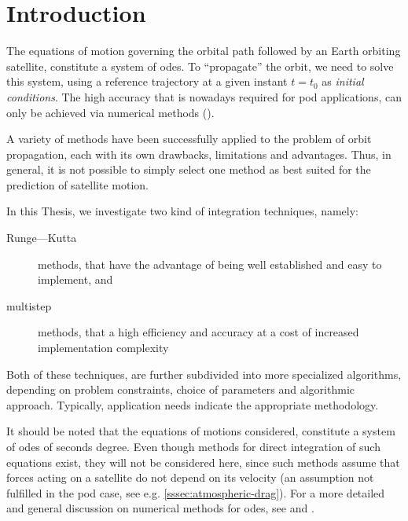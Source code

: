 \section{Introduction}\label{sec:integration-introduction}

The equations of motion governing the orbital path followed by an Earth orbiting 
satellite, constitute a system of \glspl{ode}. To ``propagate'' the orbit, we need 
to solve this system, using a reference trajectory at a given instant $t=t_0$ as 
\emph{initial conditions}. The high accuracy that is nowadays required for \gls{pod} 
applications, can only be achieved via numerical methods (\cite{Montenbruck2000}).

A variety of methods have been successfully applied to the problem of orbit 
propagation, each with its own drawbacks, limitations and advantages. Thus, in 
general, it is not possible to simply select one method as best suited for the 
prediction of satellite motion.

In this Thesis, we investigate two kind of integration techniques, namely:
\begin{description}
    \item[Runge—Kutta] methods, that have the advantage of being well established 
      and easy to implement, and
    \item[multistep] methods, that a high efficiency and accuracy at a cost of 
      increased implementation complexity
\end{description}
Both of these techniques, are further subdivided into more specialized algorithms, 
depending on problem constraints, choice of parameters and algorithmic approach. 
Typically, application needs indicate the appropriate methodology.

It should be noted that the equations of motions considered, constitute a system 
of \glspl{ode} of seconds degree. Even though methods for direct integration of 
such equations exist, they will not be considered here, since such methods assume 
that forces acting on a satellite do not depend on its velocity (an assumption not 
fulfilled in the \gls{pod} case, see e.g. \autoref{sssec:atmospheric-drag}).
For a more detailed and general discussion on numerical methods for \glspl{ode}, 
see \cite{Hairer2009I} and \cite{Hairer2010II}.

